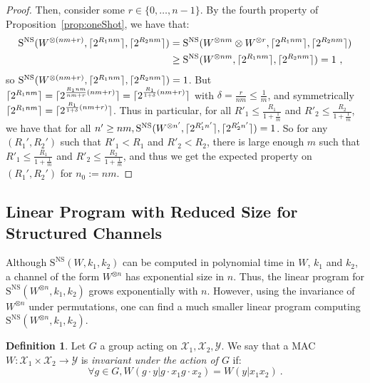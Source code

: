 \documentclass[11pt]{article}
\theoremstyle{definition}
\newtheorem{defi}[theo]{Definition}
\theoremstyle{remark}
\DeclarePairedDelimiter\ceil{\lceil}{\rceil}
\begin{document}
\begin{proof}
  Then, consider some $r \in \{0,\ldots,n-1\}$. By the fourth property of Proposition~\ref{prop:oneShot}, we have that:
  \begin{equation}
    \begin{aligned}
      \mathrm{S}^{\mathrm{NS}}(W^{\otimes (nm+r)},\ceil{2^{R_1nm}},\ceil{2^{R_2nm}}) &= \mathrm{S}^{\mathrm{NS}}(W^{\otimes nm} \otimes W^{\otimes r},\ceil{2^{R_1nm}},\ceil{2^{R_2nm}})\\
      &\geq \mathrm{S}^{\mathrm{NS}}(W^{\otimes nm},\ceil{2^{R_1nm}},\ceil{2^{R_2nm}}) = 1 \ ,
    \end{aligned}
  \end{equation}
  so $\mathrm{S}^{\mathrm{NS}}(W^{\otimes (nm+r)},\ceil{2^{R_1nm}},\ceil{2^{R_2nm}}) = 1$. But $\ceil{2^{R_1nm}} = \ceil{2^{\frac{R_1nm}{nm+r}(nm+r)}} = \ceil{2^{\frac{R_1}{1+\delta}(nm+r)}}$ with $\delta = \frac{r}{nm} \leq \frac{1}{m}$, and symmetrically $\ceil{2^{R_1nm}} = \ceil{2^{\frac{R_1}{1+\delta}(nm+r)}}$. Thus in particular, for all $R'_1 \leq \frac{R_1}{1+\frac{1}{m}}$ and $R'_2 \leq \frac{R_2}{1+\frac{1}{m}}$, we have that for all $n'\geq nm, \mathrm{S}^{\mathrm{NS}}(W^{\otimes n'},\ceil{2^{R_1'n'}},\ceil{2^{R_2'n'}}) = 1$. So for any $(R_1',R_2')$ such that $R'_1 < R_1$ and $R'_2 < R_2$, there is large enough $m$ such that $R'_1 \leq \frac{R_1}{1+\frac{1}{m}}$ and $R'_2 \leq \frac{R_2}{1+\frac{1}{m}}$, and thus we get the expected property on $(R_1',R_2')$ for $n_0:=nm$.
\end{proof}

\subsection{Linear Program with Reduced Size for Structured Channels}

Although $\mathrm{S}^{\mathrm{NS}}(W,k_1,k_2)$ can be computed in polynomial time in $W$, $k_1$ and $k_2$, a channel of the form $W^{\otimes n}$ has exponential size in $n$. Thus, the linear program for $\mathrm{S}^{\mathrm{NS}}(W^{\otimes n},k_1,k_2)$ grows exponentially with $n$. However, using the invariance of $W^{\otimes n}$ under permutations, one can find a much smaller linear program computing $\mathrm{S}^{\mathrm{NS}}(W^{\otimes n},k_1,k_2)$.


\begin{defi} Let $G$ a group acting on $\mathcal{X}_1,\mathcal{X}_2,\mathcal{Y}$. We say that a MAC $W : \mathcal{X}_1 \times \mathcal{X}_2 \rightarrow \mathcal{Y}$ is \emph{invariant under the action of $G$} if:
  \[\forall g \in G, W(g \cdot y|g \cdot x_1 g \cdot x_2)=W(y|x_1x_2) \ .\]
\end{defi}
\end{document}
